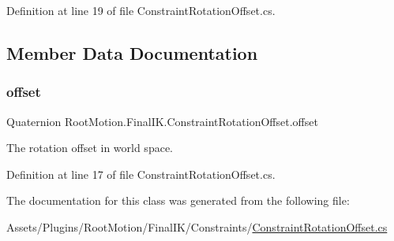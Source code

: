 Definition at line 19 of file Constraint\+Rotation\+Offset.\+cs.



\subsection{Member Data Documentation}
\mbox{\label{class_root_motion_1_1_final_i_k_1_1_constraint_rotation_offset_a83777f35fc333d6d02c1b4a17e057112}} 
\subsubsection{\texorpdfstring{offset}{offset}}
{\footnotesize\ttfamily Quaternion Root\+Motion.\+Final\+I\+K.\+Constraint\+Rotation\+Offset.\+offset}



The rotation offset in world space. 



Definition at line 17 of file Constraint\+Rotation\+Offset.\+cs.



The documentation for this class was generated from the following file\+:\begin{DoxyCompactItemize}
\item 
Assets/\+Plugins/\+Root\+Motion/\+Final\+I\+K/\+Constraints/\mbox{\hyperlink{_constraint_rotation_offset_8cs}{Constraint\+Rotation\+Offset.\+cs}}\end{DoxyCompactItemize}
